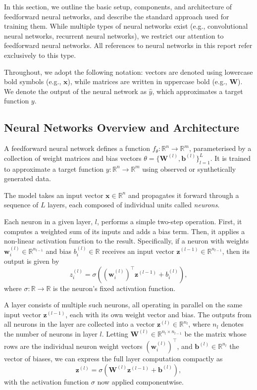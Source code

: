 In this section, we outline the basic setup, components, and architecture of feedforward neural 
networks, and describe the standard approach used for training them. While multiple types of neural 
networks exist (e.g., convolutional neural networks, recurrent neural networks), we restrict our 
attention to feedforward neural networks. All references to neural networks in this report refer 
exclusively to this type.

Throughout, we adopt the following notation: vectors are denoted using lowercase bold symbols 
(e.g., $\mathbf{x}$), while matrices are written in uppercase bold (e.g., $\mathbf{W}$). We denote 
the output of the neural network as $\hat{y}$, which approximates a target function $y$.

\subsection{Neural Networks Overview and Architecture}

A feedforward neural network defines a function \( f_\theta : \mathbb{R}^n \to \mathbb{R}^m \), 
parameterised by a collection of weight matrices and bias vectors \( \theta = \{ \mathbf{W}^{(l)},
\mathbf{b}^{(l)} \}_{l=1}^L \). It is trained to approximate a target function \( y : \mathbb{R}^n \to 
\mathbb{R}^m \) using observed or synthetically generated data.

The model takes an input vector \( \mathbf{x} \in \mathbb{R}^n \) and propagates it forward through a
sequence of $L$ layers, each composed of individual units called \emph{neurons}. 

Each neuron in a given layer, $l$, performs a simple two-step operation. First, it computes a weighted
sum of its inputs and adds a bias term. Then, it applies a non-linear activation function to the result.
Specifically, if a neuron with weights \( \mathbf{w}^{(l)}_i \in \mathbb{R}^{n_{l-1}} \) and bias 
\( b^{(l)}_i \in \mathbb{R} \) receives an input vector \( \mathbf{z}^{(l-1)} \in \mathbb{R}^{n_{l-1}} \), 
then its output is given by
\[
    z^{(l)}_i = \sigma\left( (\mathbf{w}^{(l)}_i)^\top \mathbf{z}^{(l-1)} + b^{(l)}_i \right),
\]
where \( \sigma: \mathbb{R} \to \mathbb{R} \) is the neuron's fixed activation function.

A layer consists of multiple such neurons, all operating in parallel on the same input vector 
\( \mathbf{z}^{(l-1)} \), each with its own weight vector and bias. The outputs from all neurons in the
layer are collected into a vector \( \mathbf{z}^{(l)} \in \mathbb{R}^{n_l} \), where \( n_l \) denotes 
the number of neurons in layer \( l \). Letting \( \mathbf{W}^{(l)} \in 
\mathbb{R}^{n_l \times n_{l-1}} \) be the matrix whose rows are the individual neuron weight vectors 
\( (\mathbf{w}^{(l)}_i)^\top \), and \( \mathbf{b}^{(l)} \in \mathbb{R}^{n_l} \) the vector of biases, 
we can express the full layer computation compactly as
\[
    \mathbf{z}^{(l)} = \sigma\left( \mathbf{W}^{(l)} \mathbf{z}^{(l-1)} + \mathbf{b}^{(l)} \right),
\]
with the activation function \( \sigma \) now applied componentwise.

